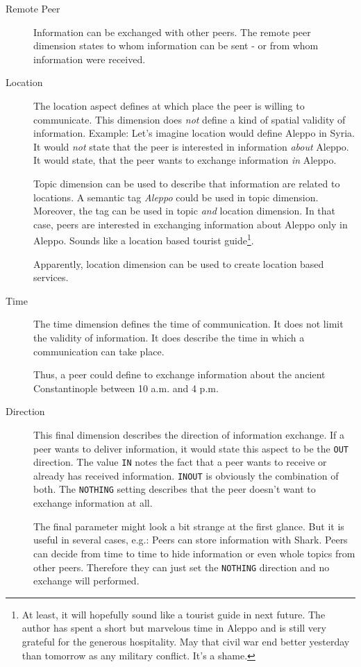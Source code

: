 \begin{description}
    \item[Remote Peer] Information can be exchanged with other peers. The remote peer dimension states to whom information can be sent - or from whom information were received.

    \item[Location] 
The location aspect defines at which place the peer is willing to communicate. This dimension does {\it not} define a kind of spatial validity of information. Example: Let's imagine location would define Aleppo in Syria. It would {\it not} state that the peer is interested in information {\it about} Aleppo. It would state, that the peer wants to exchange information {\it in} Aleppo.

Topic dimension can be used to describe that information are related to locations. A semantic tag {\it Aleppo} could be used in topic dimension. Moreover, the tag can be used in topic {\it and} location dimension. In that case, peers are interested in exchanging information about Aleppo only in Aleppo. Sounds like a location based tourist guide\footnote{At least, it will hopefully sound like a tourist guide in next future. The author has spent a short but marvelous time in Aleppo and is still very grateful for the generous hospitality. May that civil war end better yesterday than tomorrow as any military conflict. It's a shame.}.

Apparently, location dimension can be used to create location based services.

    \item[Time] 
The time dimension defines the time of communication. It does not limit the validity of information. It does describe the time in which a communication can take place.

Thus, a peer could define to exchange information about the ancient Constantinople between 10 a.m. and 4 p.m.

    \item[Direction] 
This final dimension describes the direction of information exchange. If a peer wants to deliver information, it would state this aspect to be the {\tt OUT} direction. The value {\tt IN} notes the fact that a peer wants to receive or already has received information. {\tt INOUT} is obviously the combination of both. The {\tt NOTHING} setting describes that the peer doesn't want to exchange information at all.

The final parameter might look a bit strange at the first glance. But it is useful in several cases, e.g.: Peers can store information with Shark. Peers can decide from time to time to hide information or even whole topics from other peers. Therefore they can just set the {\tt NOTHING} direction and no exchange will performed.

\end{description}

